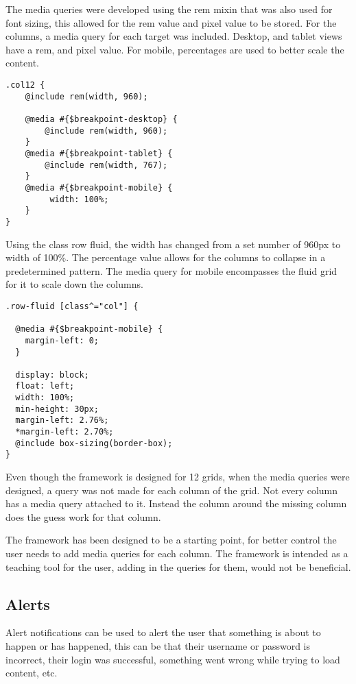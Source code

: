 The media queries were developed using the rem mixin that was also used for font sizing, this allowed for the rem value and pixel value to be stored. For the columns, a media query for each target was included. Desktop, and tablet views have a rem, and pixel value. For mobile, percentages are used to better scale the content.

\begin{lstlisting}[language=CSS3]
.col12 {
	@include rem(width, 960);

	@media #{$breakpoint-desktop} {
		@include rem(width, 960);
	}
	@media #{$breakpoint-tablet} {
		@include rem(width, 767);
	}
	@media #{$breakpoint-mobile} {
		 width: 100%;
	}
}
\end{lstlisting}

Using the class row fluid, the width has changed from a set number of 960px to width of 100\%. The percentage value allows for the columns to collapse in a predetermined pattern. The media query for mobile encompasses the fluid grid for it to scale down the columns. 

\begin{lstlisting}[language=CSS3]
.row-fluid [class^="col"] {

  @media #{$breakpoint-mobile} {
    margin-left: 0;
  }

  display: block;
  float: left;
  width: 100%;
  min-height: 30px;
  margin-left: 2.76%;
  *margin-left: 2.70%;
  @include box-sizing(border-box);
}
\end{lstlisting}
Even though the framework is designed for 12 grids, when the media queries were designed, a query was not made for each column of the grid. Not every column has a media query attached to it. Instead the column around the missing column does the guess work for that column. 

The framework has been designed to be a starting point, for better control the user needs to add media queries for each column. The framework is intended as a teaching tool for the user, adding in the queries for them, would not be beneficial. 

\newpage
\subsection*{Alerts}
Alert notifications can be used to alert the user that something is about to happen or has happened, this can be that their username or password is incorrect, their login was successful, something went wrong while trying to load content, etc.

